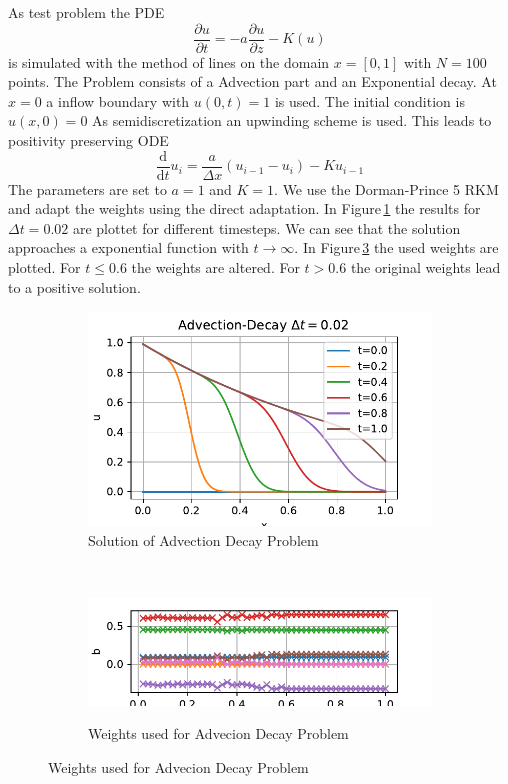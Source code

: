 \documentclass[a4paper]{scrartcl}
\numberwithin{equation}{section}
\theoremstyle{plain}
\theoremstyle{definition}
\numberwithin{theorem}{section}
\newcommand{\1}{\mathbbm{1}}
\begin{document}
As test problem the PDE
\begin{equation}
\frac{\partial u}{\partial t} = -a \frac{\partial u}{\partial z} - K (u)
\end{equation}
is simulated with the method of lines on the domain $x = [0,1]$ with $N =100$ points. The Problem consists of a Advection part and an Exponential decay. At $x=0$ a inflow boundary with $u(0,t)=1$ is used. The initial condition is $u(x,0)=0$
As semidiscretization an upwinding scheme is used. This leads to positivity preserving ODE
\begin{equation}
\frac{\mathrm d}{\mathrm d t} u_i = \frac{a}{\Delta x} \left( u_{i-1} - u_i \right) - K u_{i-1}
\end{equation}
The parameters are set to $a=1$ and $K=1$.
We use the Dorman-Prince 5 RKM and adapt the weights using the direct adaptation.
In Figure\,\ref{fig:sol_AdDe} the results for $\Delta t = 0.02$ are plottet for different timesteps. We can see that the solution approaches a exponential function with $t \rightarrow \infty$.
In Figure\,\ref{fig:weights_AdDe} the used weights are plotted. For $t\leq 0.6$ the weights are altered. For $t > 0.6$ the original weights lead to a positive solution.
\begin{figure}
\centering
\begin{subfigure}[b]{0.45\textwidth}
\includegraphics[width=1\textwidth]{plots/Advection_Decay.pdf}
\caption{Solution of Advection Decay Problem}
\label{fig:sol_AdDe}
\end{subfigure}
\\
\begin{subfigure}[b]{0.45\textwidth}
\includegraphics[width=1\textwidth]{plots/b_Advection_Decay.pdf}\\
\caption{Weights used for Advecion Decay Problem}
\label{fig:weights_AdDe}
\end{subfigure}
\end{figure}
\end{document}
